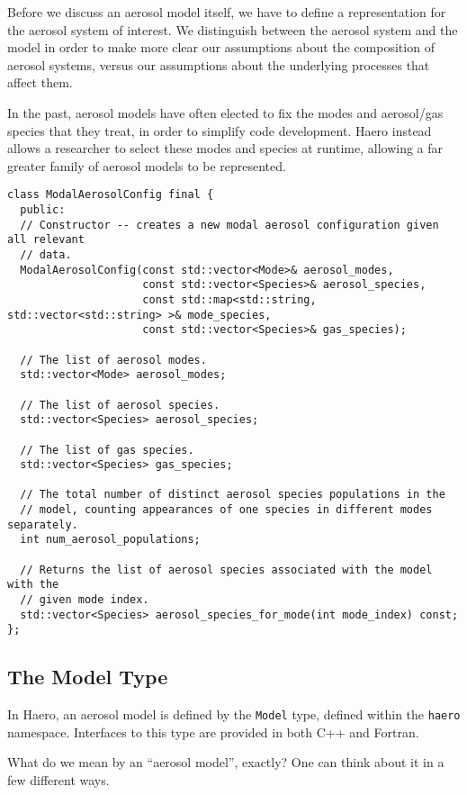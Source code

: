 Before we discuss an aerosol model itself, we have to define a representation
for the aerosol system of interest. We distinguish between the aerosol system
and the model in order to make more clear our assumptions about the composition
of aerosol systems, versus our assumptions about the underlying processes that
affect them.

In the past, aerosol models have often elected to fix the modes and aerosol/gas
species that they treat, in order to simplify code development. Haero instead
allows a researcher to select these modes and species at runtime, allowing a
far greater family of aerosol models to be represented.

\begin{lstlisting}
class ModalAerosolConfig final {
  public:
  // Constructor -- creates a new modal aerosol configuration given all relevant
  // data.
  ModalAerosolConfig(const std::vector<Mode>& aerosol_modes,
                     const std::vector<Species>& aerosol_species,
                     const std::map<std::string, std::vector<std::string> >& mode_species,
                     const std::vector<Species>& gas_species);

  // The list of aerosol modes.
  std::vector<Mode> aerosol_modes;

  // The list of aerosol species.
  std::vector<Species> aerosol_species;

  // The list of gas species.
  std::vector<Species> gas_species;

  // The total number of distinct aerosol species populations in the
  // model, counting appearances of one species in different modes separately.
  int num_aerosol_populations;

  // Returns the list of aerosol species associated with the model with the
  // given mode index.
  std::vector<Species> aerosol_species_for_mode(int mode_index) const;
};
\end{lstlisting}

\subsection{The Model Type}

In Haero, an aerosol model is defined by the \texttt{Model} type, defined within
the \texttt{haero} namespace. Interfaces to this type are provided in both C++ and
Fortran.

What do we mean by an ``aerosol model'', exactly? One can think about it in a
few different ways.

